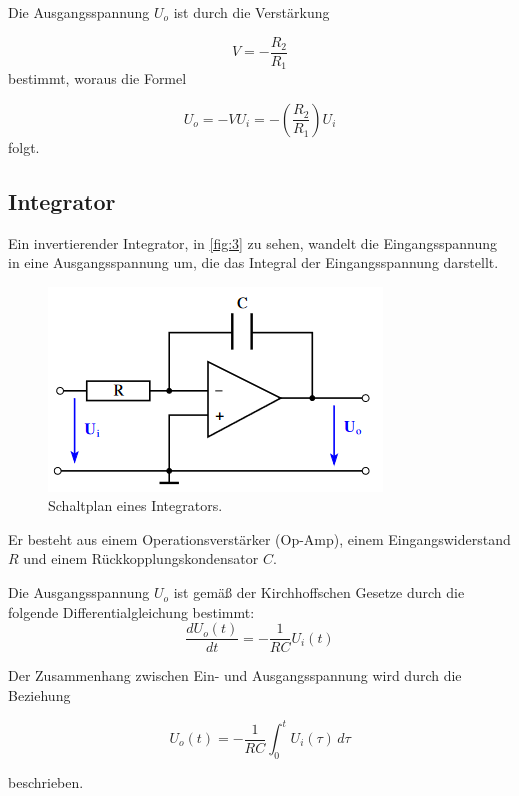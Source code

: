 \documentclass[12pt]{article}
\begin{document}
Die Ausgangsspannung \( U_o \) ist durch die Verstärkung

\begin{equation}
    V = - \frac{R_2}{R_1}
\end{equation}
bestimmt, woraus die Formel

\begin{equation}
    U_o = - V U_i = - \left( \frac{R_2}{R_1} \right) U_i
\end{equation}
folgt.
\subsection{Integrator}
Ein invertierender Integrator, in \autoref{fig:3} zu sehen, wandelt die Eingangsspannung in eine Ausgangsspannung um, die das Integral der Eingangsspannung darstellt.
\begin{figure}[H]
  \centering
  \includegraphics[scale=0.8]{Ressourcen/integrator.png}
  \caption{Schaltplan eines Integrators\cite{anleitung}.}\label{fig:3}
\end{figure}
Er besteht aus einem Operationsverstärker (Op-Amp), einem Eingangswiderstand \( R \) und einem Rückkopplungskondensator \( C \).

Die Ausgangsspannung \( U_o \) ist gemäß der Kirchhoffschen Gesetze durch die folgende Differentialgleichung bestimmt:
\begin{equation}
  \frac{dU_o(t)}{dt} = -\frac{1}{RC} U_i(t)
\end{equation}


Der Zusammenhang zwischen Ein- und Ausgangsspannung wird durch die Beziehung

\begin{equation}
  U_o(t) = -\frac{1}{RC} \int_0^t U_i(\tau) \, d\tau\label{eqn:int}
\end{equation}

beschrieben.
\end{document}
